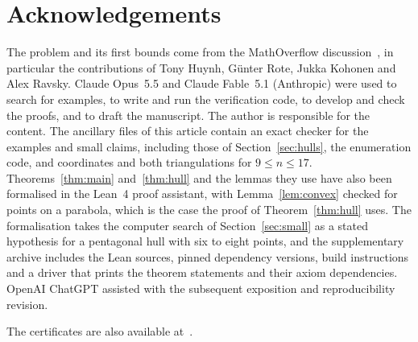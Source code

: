 \documentclass[11pt]{amsart}
\theoremstyle{definition}
\newif\ifanon
\begin{document}
\section*{Acknowledgements}
The problem and its first bounds come from the MathOverflow discussion~\cite{MO}, in particular the contributions of Tony Huynh, G\"unter Rote, Jukka Kohonen and Alex Ravsky. Claude Opus~5.5 and Claude Fable~5.1 (Anthropic) were used to search for examples, to write and run the verification code, to develop and check the proofs, and to draft the manuscript. The author is responsible for the content. The ancillary files of this article contain an exact checker for the examples and small claims, including those of Section~\ref{sec:hulls}, the enumeration code, and coordinates and both triangulations for $9\leq n\leq17$. Theorems~\ref{thm:main} and~\ref{thm:hull} and the lemmas they use have also been formalised in the Lean~4 proof assistant, with Lemma~\ref{lem:convex} checked for points on a parabola, which is the case the proof of Theorem~\ref{thm:hull} uses. The formalisation takes the computer search of Section~\ref{sec:small} as a stated hypothesis for a pentagonal hull with six to eight points, and the supplementary archive includes the Lean sources, pinned dependency versions, build instructions and a driver that prints the theorem statements and their axiom dependencies. OpenAI ChatGPT assisted with the subsequent exposition and reproducibility revision.
\ifanon\else
The certificates are also available at~\cite{repo}.
\fi
\end{document}
